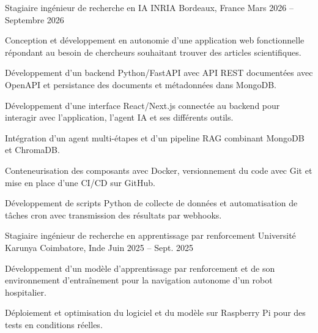 
\begin{cventries}
  \cventry
    {Stagiaire ingénieur de recherche en IA}
    {INRIA}
    {Bordeaux, France}
    {Mars 2026 -- Septembre 2026}
    {
      \begin{cvitems}
        \item {Conception et développement en autonomie d’une application web fonctionnelle répondant au besoin de chercheurs souhaitant trouver des articles scientifiques.}
        \item {Développement d’un backend Python/FastAPI avec API REST documentées avec OpenAPI et persistance des documents et métadonnées dans MongoDB.}
        \item {Développement d’une interface React/Next.js connectée au backend pour interagir avec l’application, l’agent IA et ses différents outils.}
        \item {Intégration d’un agent multi-étapes et d’un pipeline RAG combinant MongoDB et ChromaDB.}
        \item {Conteneurisation des composants avec Docker, versionnement du code avec Git et mise en place d’une CI/CD sur GitHub.}
        \item {Développement de scripts Python de collecte de données et automatisation de tâches cron avec transmission des résultats par webhooks.}
      \end{cvitems}
    }

  \cventry
    {Stagiaire ingénieur de recherche en apprentissage par renforcement}
    {Université Karunya}
    {Coimbatore, Inde}
    {Juin 2025 -- Sept. 2025}
    {
      \begin{cvitems}
        \item {Développement d’un modèle d’apprentissage par renforcement et de son environnement d’entraînement pour la navigation autonome d’un robot hospitalier.}
        \item {Déploiement et optimisation du logiciel et du modèle sur Raspberry Pi pour des tests en conditions réelles.}
      \end{cvitems}
    }
\end{cventries}
